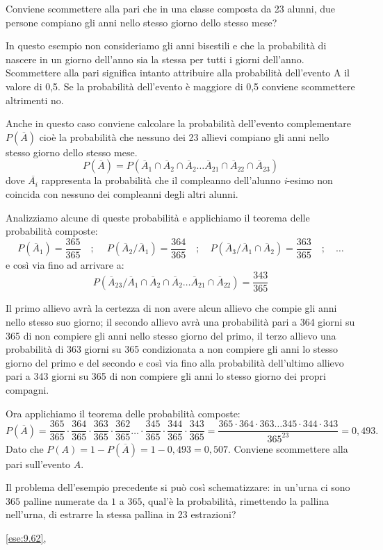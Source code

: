 \begin{esempio}
Conviene scommettere alla pari che in una classe composta da 23 alunni, due 
persone compiano gli anni nello stesso giorno dello stesso mese?

In questo esempio non consideriamo gli anni bisestili e che la probabilità 
di 
nascere in un giorno dell'anno sia la stessa per tutti i giorni dell'anno. 
Scommettere alla pari significa intanto attribuire alla probabilità 
dell'evento 
A il valore di 0,5. Se la probabilità dell'evento è maggiore di 0,5 
conviene 
scommettere altrimenti no.

Anche in questo caso conviene calcolare la probabilità dell'evento 
complementare 
$P(\overline A)$ cioè la probabilità che nessuno dei 23 allievi compiano 
gli 
anni nello stesso giorno dello stesso mese.
\[P(\overline A)=P(\overline A_1\cap 
\overline A_2\cap \overline A_2\ldots \overline A_{21}\cap \overline 
A_{22}\cap 
\overline A_{23})\] dove $\overline{A_i}$ rappresenta la probabilità che il 
compleanno dell'alunno \emph{i}{}-esimo non coincida con nessuno dei 
compleanni 
degli altri alunni.

Analizziamo alcune di queste probabilità e applichiamo il teorema delle 
probabilità composte: \[P(\overline A_1)=\frac{365}{365}\quad ;\quad \ 
P(\overline 
A_2/\overline A_1)=\frac{364}{365} \quad ;\quad  P(\overline A_3/\overline 
A_1\cap 
\overline 
A_2)=\frac{363}{365}\quad ;\quad \dots\] e così via fino ad arrivare a: 
\[P(\overline A_{23}/\overline A_1\cap \overline A_2\cap \overline 
A_2\ldots 
\overline A_{21}\cap \overline A_{22})=\frac{343}{365}\]

Il primo allievo avrà la certezza di non avere alcun allievo che compie gli 
anni 
nello stesso suo giorno; il secondo allievo avrà una probabilità pari a 364 
giorni su 365 di non compiere gli anni nello stesso giorno del primo, il 
terzo 
allievo una probabilità di 363 giorni su 365 condizionata a non compiere 
gli 
anni lo stesso giorno del primo e del secondo e così via fino alla 
probabilità 
dell'ultimo allievo pari a 343 giorni su 365 di non compiere gli anni lo 
stesso 
giorno dei propri compagni.

Ora applichiamo il teorema delle probabilità composte: \[ P(\overline 
A)=\frac{365}{365}\cdot \frac{364}{365}\cdot \frac{363}{365}\cdot 
\frac{362}{365}\ldots \cdot \frac{345}{365}\cdot \frac{344}{365}\cdot 
\frac{343}{365}=\frac{365\cdot 364\cdot 363\ldots 345 \cdot 344\cdot 
343}{365^{23}}=0,493. \] Dato che $P(A)=1-P(\overline A)=1-0,493=0,507$.
\conclusione Conviene scommettere alla pari sull'evento $ A $.
\end{esempio}
Il problema dell'esempio precedente si può così schematizzare: in un'urna 
ci 
sono $ 365 $ palline numerate da $ 1 $ a $ 365 $, qual'è la probabilità, 
rimettendo la pallina nell'urna, di estrarre la stessa pallina in 23 
estrazioni?

\ref{ese:9.62}, 
